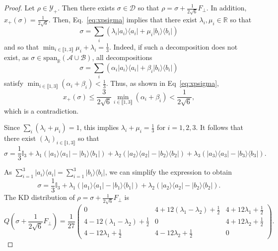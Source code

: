 \documentclass[a4paper, notitlepage, 11pt]{article}
\numberwithin{equation}{section}
\newcommand{\bra}[1]{\langle #1|}
\newcommand{\cket}[1]{|#1\rangle}
\newcommand{\mcl}[1]{\mathcal{#1}}
\newcommand{\Acal}{{\mathcal A}}
\newcommand{\Bcal}{{\mathcal B}}
\newcommand{\spanRAB}{{\mathrm{span}_{\R}(\Acal\cup\Bcal)}}
\newcommand{\R}{\mathbb{R}}
\newcommand{\bbone}{\mathbb{I}}
\newcommand{\IntEnt}[2]{\llbracket #1 , #2 \rrbracket}
\begin{document}
\begin{proof}
Let $\rho\in\mcl{Y}_{+}$. Then there exists $\sigma\in\mathcal D$ so that $\rho=\sigma+\frac{1}{2\sqrt6}F_\perp$. In addition, $x_+(\sigma)=\frac1{2\sqrt6}$. Then,  Eq.~\eqref{eq:xpsigma} implies that there exist $\lambda_i,\mu_i\in\R$ so that $$\sigma=\sum_i(\lambda_i|a_i\rangle\langle a_i|+ \mu_i|b_i\rangle\langle b_i|)
$$
and so that 
$\min_{i\in\IntEnt{1}{3}} \mu_i+\lambda_i = \frac{1}{3}$. Indeed, if such a decomposition does not exist, as $\sigma\in \spanRAB$, all decompositions 
\[
\sigma=\sum_i(\alpha_i|a_i\rangle\langle a_i|+ \beta_i|b_i\rangle\langle b_i|)
\] 
satisfy $\min_{i\in\IntEnt{1}{3}} (\alpha_i+\beta_i) < \frac{1}{3}$. Thus, as shown in Eq~\eqref{eq:xpsigma},
\[
x_{+}(\sigma) \leqslant \frac{3}{2\sqrt{6}}\min_{i\in\IntEnt{1}{3}} (\alpha_i+\beta_i) < \frac{1}{2\sqrt{6}},
\]
which is a contradiction.

 Since $\sum_i(\lambda_i+\mu_i)=1$, this implies $\lambda_i+\mu_i=\frac13$ for $i=1,2,3$. It follows that there exist $(\lambda_i)_{i\in\IntEnt{1}{3}}$ so that
\[
\sigma= \frac{1}{3}\bbone_{3} +\lambda_1(\cket{a_1}\bra{a_1} - \cket{b_1}\bra{b_1}) + \lambda_2(\cket{a_2}\bra{a_2} - \cket{b_2}\bra{b_2}) + \lambda_3(\cket{a_3}\bra{a_3} - \cket{b_3}\bra{b_3}).
\]

As $\sum_{i=1}^{3} \cket{a_i}\bra{a_i}= \sum_{i=1}^{3} \cket{b_i}\bra{b_i}$, we can simplify the expression to obtain
\begin{equation}\label{eq:sigmaform}
\sigma= \frac{1}{3}\bbone_{3} + \lambda_1(\cket{a_1}\bra{a_1} - \cket{b_1}\bra{b_1}) + \lambda_2(\cket{a_2}\bra{a_2} - \cket{b_2}\bra{b_2}).
\end{equation}
The KD distribution of $\rho=\sigma+\frac{1}{2\sqrt{6}}F_{\perp}$ is
\[
Q(\sigma+\frac{1}{2\sqrt{6}}F_{\perp}) = 
\frac{1}{27}\begin{pmatrix}
0& 4 +12(\lambda_1-\lambda_2)+\frac{1}{2} & 4 +12\lambda_1+\frac{1}{2} \\
 4 - 12(\lambda_1-\lambda_2)+\frac{1}{2} & 0& 4+12\lambda_2+\frac{1}{2}\\
4 - 12\lambda_1+\frac{1}{2} & 4-12\lambda_2+\frac{1}{2} & 0
\end{pmatrix}.
\]


\end{proof}
\end{document}
